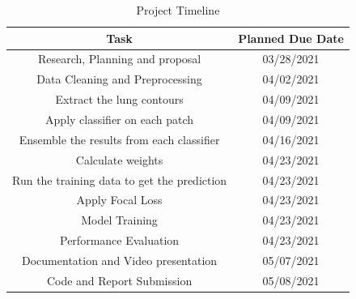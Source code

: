 \documentclass{sigkddExp}
\begin{document}
\begin{table}[H]
    \centering
    \caption{Project Timeline}
    \begin{tabular}{|c|c|} \hline
        Task&Planned Due Date\\ \hline
        Research, Planning and proposal &03/28/2021\\ \hline
        Data Cleaning and Preprocessing & 04/02/2021\\ \hline
        Extract the lung contours & 04/09/2021\\ \hline
        Apply classifier on each patch & 04/09/2021\\ \hline
        Ensemble the results from each classifier & 04/16/2021\\ \hline
        Calculate weights & 04/23/2021 \\ \hline
        Run the training data to get the prediction & 04/23/2021 \\ \hline
        Apply Focal Loss & 04/23/2021 \\ \hline
        Model Training & 04/23/2021 \\ \hline
        Performance Evaluation & 04/23/2021 \\ \hline
        Documentation and Video presentation & 05/07/2021 \\
        Code and Report Submission & 05/08/2021 \\
        \hline\end{tabular}
    \end{table}
    
    
    
    
\end{document}
